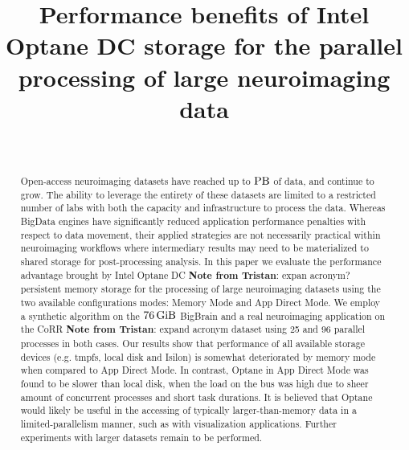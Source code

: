 \documentclass[conference]{IEEEtran}
\newcommand{\bigbrain}{BigBrain }
\newcommand{\tristan}[1]{\color{orange}\textbf{Note from Tristan}:
      #1 \color{black}}
\begin{document}
\title{Performance benefits of Intel Optane DC storage for the parallel processing of large neuroimaging data}

\author{\\
}
\maketitle

\begin{abstract}
    Open-access neuroimaging datasets have reached up to $\SI{}{\peta\byte}$ of data, and
    continue to grow. The ability to leverage the entirety of these datasets are
    limited to a restricted number of labs with both the capacity and infrastructure
    to process the data. Whereas BigData engines have significantly reduced
    application performance penalties with respect to data movement, their applied
    strategies are not necessarily practical within neuroimaging workflows where
    intermediary results may need to be materialized to shared storage for post-processing
    analysis. In this paper we evaluate the performance advantage brought by Intel
    Optane DC \tristan{expan acronym?} persistent memory storage for the processing of large neuroimaging 
    datasets using the two available configurations modes: Memory Mode and App Direct Mode.
    We employ a synthetic algorithm on the $\SI{76}{\gibi\byte}$ \bigbrain
    and a real neuroimaging application on the CoRR \tristan{expand acronym} dataset using 25 and 96 parallel
    processes in both cases. Our results show that performance of all available storage
    devices (e.g. tmpfs, local disk and Isilon) is somewhat deteriorated by memory mode
    when compared to App Direct Mode. In contrast, Optane in App Direct Mode was
    found to be slower than local disk, when the load on the bus was high due to sheer
    amount of concurrent processes and short task durations. It is believed that
    Optane would likely be useful in the accessing of typically larger-than-memory
    data in a limited-parallelism manner, such as with visualization applications.
    Further experiments with larger datasets remain to be performed.

\end{abstract}
\end{document}
